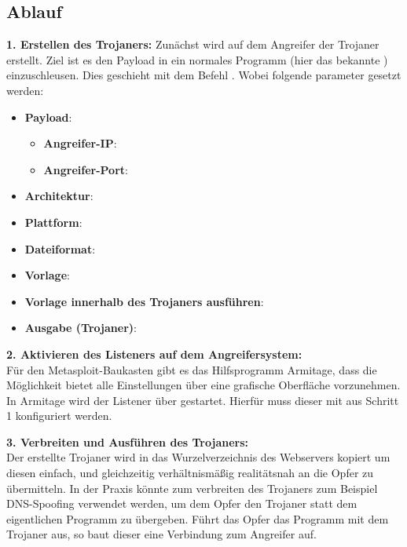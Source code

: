 \subsection{Ablauf}\label{sec:praktischeDurchfuehrung-ablauf}

\textbf{1. Erstellen des Trojaners: } 
Zunächst wird auf dem Angreifer der Trojaner erstellt.
Ziel ist es den Payload  in ein normales Programm (hier das bekannte ) einzuschleusen. 
Dies geschieht mit dem Befehl . Wobei folgende parameter gesetzt werden:
\begin{itemize}
	\item \textbf{Payload}: 
	      \begin{itemize}
		      \item  \textbf{Angreifer-IP}: 
		      \item \textbf{Angreifer-Port}: 
		  \end{itemize}
	\item \textbf{Architektur}: 
	\item \textbf{Plattform}: 
	\item \textbf{Dateiformat}: 
	\item \textbf{Vorlage}: 
	\item \textbf{Vorlage innerhalb des Trojaners ausführen}: 
	\item \textbf{Ausgabe (Trojaner)}: 
\end{itemize}

\textbf{2. Aktivieren des Listeners auf dem Angreifersystem: } \hfill \\
Für den Metasploit-Baukasten gibt es das Hilfsprogramm Armitage, dass die Möglichkeit bietet alle Einstellungen über eine grafische Oberfläche vorzunehmen.
In Armitage wird der Listener über  gestartet. Hierfür muss dieser mit  aus Schritt 1 konfiguriert werden.


\textbf{3. Verbreiten und Ausführen des Trojaners: } \hfill \\
Der erstellte Trojaner wird in das Wurzelverzeichnis des Webservers  kopiert um diesen einfach, und gleichzeitig verhältnismäßig realitätsnah an die Opfer zu übermitteln.
In der Praxis könnte zum verbreiten des Trojaners zum Beispiel DNS-Spoofing verwendet werden, um dem Opfer den Trojaner statt dem eigentlichen Programm zu übergeben.
Führt das Opfer das Programm mit dem Trojaner aus, so baut dieser eine Verbindung zum Angreifer auf. 


